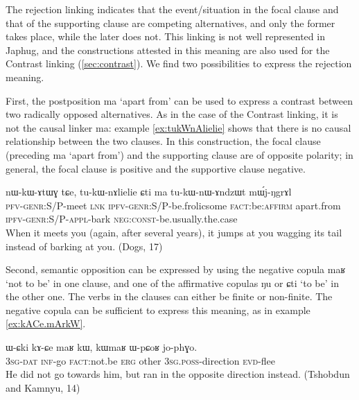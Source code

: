 \documentclass[oldfontcommands,oneside,a4paper,11pt]{article}
\newcommand{\ipa}[1]{{\phon \mbox{#1}}} %
\begin{document}
The rejection linking indicates that the event/situation in the focal clause and that of the supporting clause are competing alternatives, and only the former takes place, while the later  does not. This linking is not well represented in Japhug, and the constructions attested in this meaning are also used for the Contrast linking (\ref{sec:contrast}). We find two possibilities to express the rejection meaning.

First, the postposition \ipa{ma} `apart from'  can be used to express a contrast between two radically opposed alternatives.  As in the case of the Contrast linking, it is not the causal linker \ipa{ma}: example \ref{ex:tukWnAlielie} shows that there is no causal relationship between the two clauses. In this construction, the focal clause (preceding  \ipa{ma} `apart from') and the supporting clause are of opposite polarity; in general, the focal clause is positive and the supportive clause negative.



\begin{exe}
\ex \label{ex:tukWnAlielie}
\gll
\ipa{nɯ-kɯ-ɤtɯɣ}  	\ipa{tɕe,}  	\ipa{tu-kɯ-nɤlielie}  	\ipa{ɕti}  	\ipa{ma}  	\ipa{tu-kɯ-nɯ-ɤndzɯt}  	\ipa{mɯ́j-ŋgrɤl}  	\\
\textsc{pfv-genr:S/P}-meet \textsc{lnk} \textsc{ipfv-genr:S/P}-be.frolicsome \textsc{fact}:be:\textsc{affirm}  apart.from \textsc{ipfv-genr:S/P}-\textsc{appl}-bark \textsc{neg:const}-be.usually.the.case \\
\glt When it meets you (again, after several years), it jumps at you wagging its tail instead of barking at you.  (Dogs, 17)
\end{exe}
 
Second, semantic opposition can be expressed by using the negative copula \ipa{maʁ} `not to be' in one clause, and one of the affirmative copulas \ipa{ŋu} or \ipa{ɕti} `to be' in the other one. The verbs in the clauses can either be finite or non-finite. The negative copula can be sufficient to express this meaning, as in example \ref{ex:kACe.mArkW}.

\begin{exe}
\ex \label{ex:kACe.mArkW}
\gll
\ipa{ɯ-ɕki}  	\ipa{kɤ-ɕe}  	\ipa{maʁ}  	\ipa{kɯ,}  	\ipa{kɯmaʁ}  	\ipa{ɯ-pɕoʁ}  	\ipa{jo-phɣo.}  \\
\textsc{3sg-dat} \textsc{inf}-go \textsc{fact}:not.be \textsc{erg} other \textsc{3sg.poss}-direction \textsc{evd}-flee \\
 \glt He did not go towards him, but ran in the opposite direction instead. (Tshobdun and Kamnyu, 14)
\end{exe}
 
\end{document}
